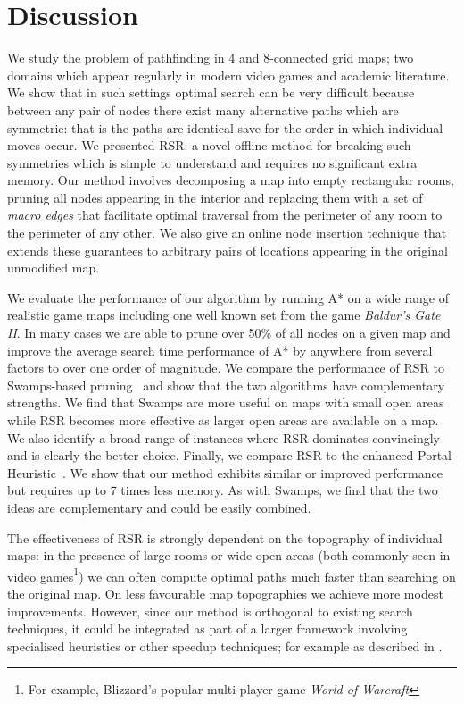 \section{Discussion}
\label{cha::rsr::discussion}
We study the problem of pathfinding in 4 and 8-connected grid maps;
two domains which appear regularly in modern video games and academic literature.
We show that in such settings optimal search can be very difficult because between
any pair of nodes there exist many alternative paths which are symmetric: that is
the paths are identical save for the order in which individual moves occur.
We presented RSR: a novel offline method for breaking such symmetries which is simple
to understand and requires no significant extra memory. 
Our method involves decomposing a map into empty rectangular rooms, pruning all nodes
appearing in the interior and replacing them with a set of \emph{macro edges}
that facilitate optimal traversal from the perimeter of any room to the perimeter
of any other.
We also give an online node insertion technique that extends these guarantees
 to arbitrary pairs of locations appearing in the original unmodified map.
\par
We evaluate the performance of our algorithm by running A* on a wide
range of realistic game maps including one well known set from the game
\emph{Baldur's Gate II}. 
In many cases we are able to prune over 50\% of all nodes on a given map
and improve the average search time performance of A* by anywhere from 
several factors to over one order of magnitude. 
We compare the performance of RSR to Swamps-based
pruning~\citep{pochter10} and show that the two algorithms have complementary
strengths.  We find that Swamps are more useful on maps with small open areas
while RSR becomes more effective as larger open areas are available on a map. We
also identify a broad range of instances where RSR dominates convincingly and is
clearly the better choice.  Finally, we compare RSR to the enhanced Portal
Heuristic~\citep{goldenberg10}.  We show that our method exhibits similar or
improved performance but requires up to 7 times less memory.  As with Swamps, we
find that the two ideas are complementary and could be easily combined.
\par
The effectiveness of RSR is strongly dependent on the topography of individual maps: 
in the presence of large rooms or wide open areas (both commonly seen in video games\footnote{For 
example, Blizzard's popular multi-player game \emph{World of Warcraft}})
we can often compute optimal paths much faster than searching on the original map. 
On less favourable map topographies we achieve more modest improvements.
However, since our method is orthogonal to existing search techniques, it could be integrated
as part of a larger framework involving specialised heuristics or other speedup techniques; 
for example as described in \citep{botea04,bjornsson05,bjornsson06}. 
